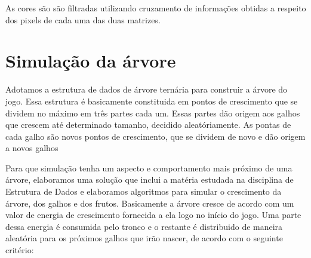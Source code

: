 \documentclass[12pt]{article}
\begin{document}
As cores s\~ao s\~ao filtradas utilizando cruzamento de informa\c c\~oes obtidas a respeito dos pixels de cada uma das duas matrizes.




\section{Simula\c c\~ao da \'arvore}

Adotamos a estrutura de dados de \'arvore tern\'aria para construir a \'arvore do jogo. Essa estrutura \'e basicamente constituida
em pontos de crescimento que se dividem no m\'aximo em tr\^es partes cada um. Essas partes d\~ao origem aos galhos que crescem at\'e
determinado tamanho, decidido aleat\'oriamente. As pontas de cada galho s\~ao novos pontos de crescimento,
que se dividem de novo e d\~ao origem a novos galhos

Para que simula\c c\~ao tenha um aspecto e comportamento mais pr\'oximo de uma \'arvore, elaboramos uma solu\c c\~ao que inclui
a mat\'eria estudada na disciplina de Estrutura de Dados e elaboramos algoritmos para simular o crescimento da \'arvore,
dos galhos e dos frutos. Basicamente a \'arvore cresce de acordo com um valor de energia de crescimento fornecida
a ela logo no in\'icio do jogo. Uma parte dessa energia \'e consumida pelo tronco e o restante \'e distribuido
de maneira aleat\'oria para os pr\'oximos galhos que ir\~ao nascer, de acordo com o seguinte crit\'erio: \\
\end{document}
